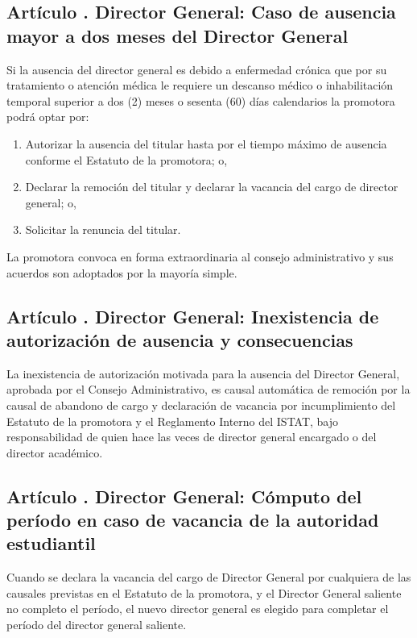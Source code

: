 \subsection{Artículo . Director General: Caso de ausencia mayor a dos meses del Director General}
\addtocounter{ns}{1}
Si la ausencia del director general es debido a enfermedad crónica que por su tratamiento o atención médica le requiere un descanso médico o inhabilitación temporal superior a dos (2) meses o sesenta (60) días calendarios la promotora podrá optar por: 
\begin{enumerate}
\item Autorizar la ausencia del titular hasta por el tiempo máximo de ausencia conforme el Estatuto de la promotora; o, 
\item Declarar la remoción del titular y declarar la vacancia del cargo de director general; o, 
\item Solicitar la renuncia del titular. 
\end{enumerate}
La promotora convoca en forma extraordinaria al consejo administrativo y sus acuerdos son adoptados por la mayoría simple.  
\subsection{Artículo . Director General: Inexistencia de autorización de ausencia y consecuencias}
\addtocounter{ns}{1}
La inexistencia de autorización motivada para la ausencia del Director General, aprobada por el Consejo Administrativo, es causal automática de remoción por la causal de abandono de cargo y declaración de vacancia por incumplimiento del Estatuto de la promotora y el Reglamento Interno del ISTAT, bajo responsabilidad de quien hace las veces de director general encargado o del director académico. 
\subsection{Artículo . Director General: Cómputo del período en caso de vacancia de la autoridad estudiantil}
\addtocounter{ns}{1}
Cuando se declara la vacancia del cargo de Director General por cualquiera de las causales previstas en el Estatuto de la promotora, y el Director General saliente no completo el período, el nuevo director general es elegido para completar el período del director general saliente. 
